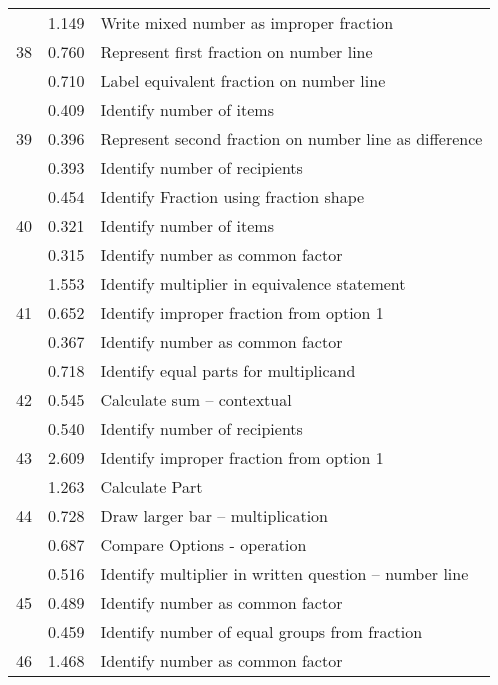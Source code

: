 \begin{longtable}[c]{|c|c|l|}
\hline
\multirow{3}{*}{\small 38} & \small 1.149 & \small Write mixed number as improper fraction \\
 & \small 0.760 & \small Represent first fraction on number line \\
 & \small 0.710 & \small Label equivalent fraction on number line \\
\hline
\multirow{3}{*}{\small 39} & \small 0.409 & \small Identify number of items \\
 & \small 0.396 & \small Represent second fraction on number line as difference \\
 & \small 0.393 & \small Identify number of recipients \\
\hline
\multirow{3}{*}{\small 40} & \small 0.454 & \small Identify Fraction using fraction shape \\
 & \small 0.321 & \small Identify number of items \\
 & \small 0.315 & \small Identify number as common factor \\
\hline
\multirow{3}{*}{\small 41} & \small 1.553 & \small Identify multiplier in equivalence statement \\
 & \small 0.652 & \small Identify improper fraction from option 1 \\
 & \small 0.367 & \small Identify number as common factor \\
\hline
\multirow{3}{*}{\small 42} & \small 0.718 & \small Identify equal parts for multiplicand \\
 & \small 0.545 & \small Calculate sum -- contextual \\
 & \small 0.540 & \small Identify number of recipients \\
\hline
\multirow{1}{*}{\small 43} & \small 2.609 & \small Identify improper fraction from option 1 \\
\hline
\multirow{3}{*}{\small 44} & \small 1.263 & \small Calculate Part \\
 & \small 0.728 & \small Draw larger bar -- multiplication \\
 & \small 0.687 & \small Compare Options - operation \\
\hline
\multirow{3}{*}{\small 45} & \small 0.516 & \small Identify multiplier in written question -- number line \\
 & \small 0.489 & \small Identify number as common factor \\
 & \small 0.459 & \small Identify number of equal groups from fraction \\
\hline
\multirow{1}{*}{\small 46} & \small 1.468 & \small Identify number as common factor \\

\end{longtable}
